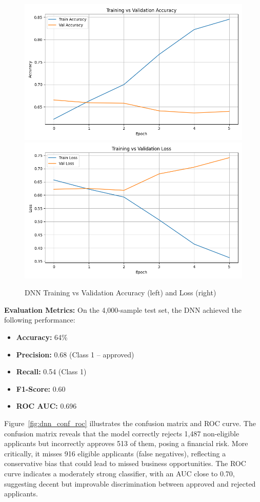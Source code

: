 \begin{figure}[H]
    \centering
    \includegraphics[width=0.47\linewidth]{figures/dnn_accuracy.png}
    \includegraphics[width=0.47\linewidth]{figures/dnn_loss.png}
    \caption{DNN Training vs Validation Accuracy (left) and Loss (right)}
    \label{fig:dnn_acc_loss}
\end{figure}

\textbf{Evaluation Metrics:}  
On the 4,000-sample test set, the DNN achieved the following performance:

\begin{itemize}
    \item \textbf{Accuracy:} 64\%
    \item \textbf{Precision:} 0.68 (Class 1 – approved)
    \item \textbf{Recall:} 0.54 (Class 1)
    \item \textbf{F1-Score:} 0.60
    \item \textbf{ROC AUC:} 0.696
\end{itemize}

Figure~\ref{fig:dnn_conf_roc} illustrates the confusion matrix and ROC curve. The confusion matrix reveals that the model correctly rejects 1,487 non-eligible applicants but incorrectly approves 513 of them, posing a financial risk. More critically, it misses 916 eligible applicants (false negatives), reflecting a conservative bias that could lead to missed business opportunities. The ROC curve indicates a moderately strong classifier, with an AUC close to 0.70, suggesting decent but improvable discrimination between approved and rejected applicants.


